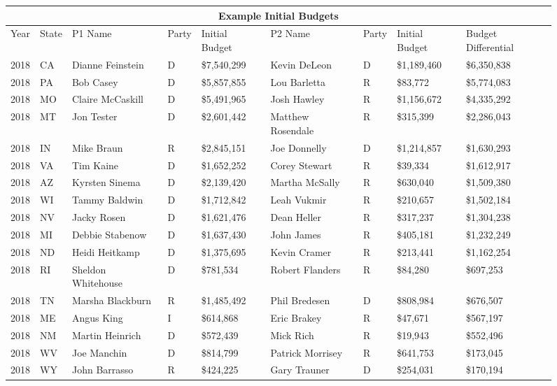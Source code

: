 \documentclass[11pt]{article}
\begin{document}
\begin{figure}
\tiny{
\begin{tabular}{ |p{.3cm} p{.4cm}|p{2.7cm} p{.4cm} p{1.6cm}|p{2.7cm} p{.4cm} p{1.6cm}|p{1.3cm}|}
\hline
\multicolumn{9}{|c|}{Example Initial Budgets} \\
\hline
Year & State & P1 Name & Party & Initial Budget & P2 Name & Party & Initial Budget & Budget Differential\\
\hline
2018 & CA & Dianne Feinstein & D & \$7,540,299 & Kevin DeLeon & D & \$1,189,460 & \$6,350,838\\
2018 & PA & Bob Casey & D & \$5,857,855 & Lou Barletta & R & \$83,772 & \$5,774,083\\
2018 & MO & Claire McCaskill & D & \$5,491,965 & Josh Hawley & R & \$1,156,672 & \$4,335,292\\
2018 & MT & Jon Tester & D & \$2,601,442 & Matthew Rosendale & R & \$315,399 & \$2,286,043\\
2018 & IN & Mike Braun & R & \$2,845,151 & Joe Donnelly & D & \$1,214,857 & \$1,630,293\\
2018 & VA & Tim Kaine & D & \$1,652,252 & Corey Stewart & R & \$39,334 & \$1,612,917\\
2018 & AZ & Kyrsten Sinema & D & \$2,139,420 &Martha McSally & R & \$630,040 & \$1,509,380\\
2018 & WI & Tammy Baldwin & D & \$1,712,842 & Leah Vukmir & R & \$210,657 & \$1,502,184\\
2018 & NV & Jacky Rosen & D & \$1,621,476 & Dean Heller & R & \$317,237 & \$1,304,238\\
2018 & MI & Debbie Stabenow & D & \$1,637,430 & John James & R & \$405,181 & \$1,232,249\\
2018 & ND & Heidi Heitkamp & D & \$1,375,695 & Kevin Cramer & R & \$213,441 & \$1,162,254\\
2018 & RI & Sheldon Whitehouse & D & \$781,534 & Robert Flanders & R & \$84,280 & \$697,253\\
2018 & TN & Marsha Blackburn & R & \$1,485,492 & Phil Bredesen & D & \$808,984 & \$676,507\\
2018 & ME & Angus King & I & \$614,868 & Eric Brakey & R & \$47,671 & \$567,197\\
2018 & NM & Martin Heinrich & D & \$572,439 & Mick Rich & R & \$19,943 & \$552,496\\
2018 & WV & Joe Manchin & D & \$814,799 & Patrick Morrisey & R & \$641,753 & \$173,045\\
2018 & WY & John Barrasso & R & \$424,225 & Gary Trauner & D & \$254,031 & \$170,194\\

\end{tabular}}
\end{figure}
\end{document}
